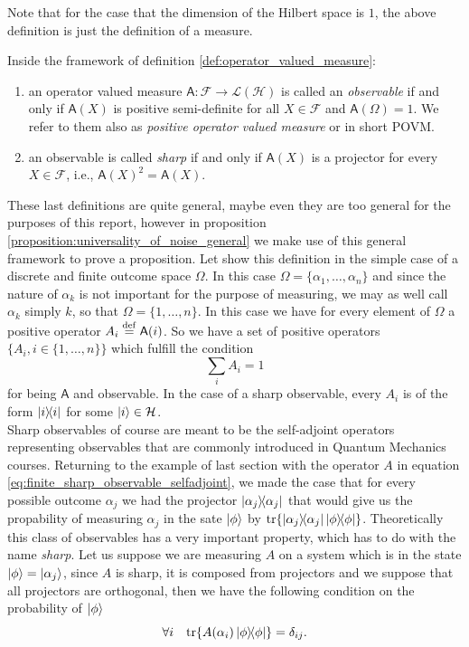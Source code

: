 \documentclass[10pt, a4paper]{amsart}
\begin{document}
Note that for the case that the dimension of the Hilbert space is $1$, the above definition is just the definition of a measure. 

\begin{definition}
Inside the framework of definition \ref{def:operator_valued_measure}:
\begin{enumerate}
\item an operator valued measure $\mathsf{A}:\mathcal{F}\to \mathcal{L}(\mathcal{H})$
is called an \emph{observable} if and only if $\mathsf{A}(X)$ is positive semi-definite for all $X\in \mathcal{F}$ and $\mathsf{A}(\Omega) = 1$. We refer to them also as \textit{positive operator valued measure} or in short POVM. 
\item an observable is called \emph{sharp} if and only if $\mathsf{A}(X)$ is a projector for every $X\in \mathcal{F}$, i.e., $\mathsf{A}(X)^{2}=\mathsf{A}(X)$.  
\end{enumerate} 
\end{definition}
These last definitions are quite general, maybe even they are too general for the purposes of this report, however in proposition \ref{proposition:universality_of_noise_general} we make use of this general framework to prove a proposition. Let show this definition in the simple case of a discrete and finite outcome space $\Omega$. In this case $\Omega = \{\alpha_{1}, \ldots , \alpha_{n}\}$ and since the nature of $\alpha_{k}$ is not important for the purpose of measuring, we may as well call $\alpha_{k}$ simply $k$, so that $\Omega = \{1, \ldots , n\}$. In this case we have for every element of $\Omega$ a positive operator $A_{i}\overset{\mathrm{def}}{=} \mathsf{A}(i) $. So we have a set of positive operators $\{A_{i}, i\in \{1, \ldots , n\}\}$ which fulfill the condition 
$$
\sum_{i}A_{i} = 1
$$
for being $\mathsf{A}$ and observable. In the case of a sharp observable, every $A_{i}$ is of the form $\left| i\right\rangle\!\!\left\langle i\right|$ for some $\left| i\right\rangle\in \mathcal{H}$.   \\

Sharp observables of course are meant to be the self-adjoint operators representing observables that are commonly introduced in 
Quantum Mechanics courses. Returning to the example of last section with the operator $A$ in equation \ref{eq:finite_sharp_observable_selfadjoint}, we made the case that for every possible outcome $\alpha_{j}$ we had the projector $\left| \alpha_{j}\right\rangle\!\!\left\langle \alpha_{j}\right|$ that would give us the propability of measuring $\alpha_{j}$ in the sate $\left| \phi\right\rangle$ by $\mathrm{tr} \{\left| \alpha_{j}\right\rangle\!\!\left\langle \alpha_{j}\right|\left| \phi\right\rangle\!\!\left\langle \phi\right|\}$. Theoretically this class of observables has a very important property, which has to do with the name \textit{sharp}. Let us suppose we are measuring $A$ on a system which is in the state $\left| \phi\right\rangle = \left| \alpha_{j}\right\rangle$, since $A$ is sharp, it is composed from projectors and we suppose that all projectors are orthogonal, then we have the following condition on the probability of $\left| \phi\right\rangle$
\begin{equation}\label{eq:sharp_observables_property}
\forall i  \quad \mathrm{tr}\{ A(\alpha_{i}) \left| \phi\right\rangle\!\!\left\langle \phi\right|\} = \delta_{ij}. 
\end{equation}
\end{document}

